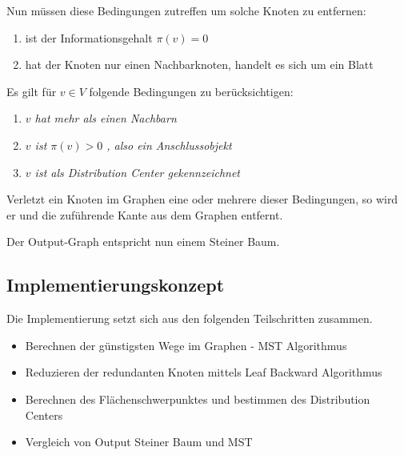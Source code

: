 Nun müssen diese Bedingungen zutreffen um solche Knoten zu entfernen:

\begin{enumerate}
	\item ist der Informationsgehalt $\pi(v) = 0 $	
	\item hat der Knoten nur einen Nachbarknoten, handelt es sich um ein Blatt
\end{enumerate}

 
Es gilt für $v\in V$ folgende Bedingungen zu berücksichtigen:


\begin{enumerate}
  \item \textit{$v$ hat mehr als einen Nachbarn} 
  \item \textit{$v$ ist $\pi(v)>0$ , also ein Anschlussobjekt} \label{l2}
  \item \textit{$v$ ist als Distribution Center gekennzeichnet} \label{l3}
\end{enumerate}

Verletzt ein Knoten im Graphen eine oder mehrere dieser Bedingungen, so wird er und die zuführende Kante aus dem Graphen entfernt. 


Der Output-Graph entspricht nun einem Steiner Baum.


\subsection{Implementierungskonzept}
\label{sec:2methoden}


\vspace{0.5cm}

Die Implementierung setzt sich aus den folgenden Teilschritten zusammen. 

\begin{itemize}
  
  \item Berechnen der günstigsten Wege im Graphen - MST Algorithmus
  \item Reduzieren der redundanten Knoten mittels Leaf Backward Algorithmus 
   \item Berechnen des Flächenschwerpunktes und bestimmen des Distribution Centers
    \item Vergleich von Output Steiner Baum und MST
\end{itemize}

